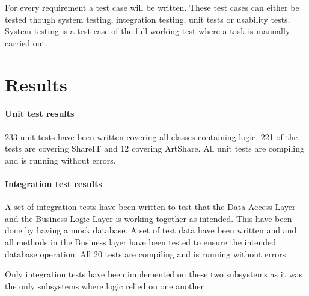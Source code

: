 \documentclass[../report.tex]{subfiles}
\begin{document}
For every requirement a test case will be written. These test cases can either be tested though system testing, integration testing, unit tests or usability tests. System testing is a test case of the full working test where a task is manually carried out. 

\section{Results}

\paragraph{Unit test results}

233 unit tests have been written covering all classes containing logic. 221 of the tests are covering ShareIT and 12 covering ArtShare. All unit tests are compiling and is running without errors.

\paragraph{Integration test results}

A set of integration tests have been written to test that the Data Access Layer and the Business Logic Layer is working together as intended. This have been done by having a mock database. A set of test data have been written and and all methods in the Business layer have been tested to ensure the intended database operation. All 20 tests are compiling and is running without errors

Only integration tests have been implemented on these two subsystems as it was the only subsystems where logic relied on one another
\end{document}
